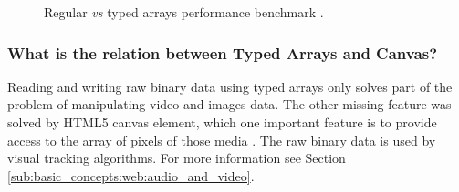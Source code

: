 \begin{figure}[!htb]
  \caption{Regular \textit{vs} typed arrays performance benchmark \cite{TypedArrayPerformance2013}.}
  \label{figure:typed_arrays_performance}
\end{figure}


\subsubsection{What is the relation between Typed Arrays and Canvas?} %
\label{subsub:basic_concepts:web:javascript_typed_arrays:relation_between_typed_and_canvas}

Reading and writing raw binary data using typed arrays only solves part of the problem of manipulating video and images data. The other missing feature was solved by HTML5 canvas element, which one important feature is to provide access to the array of pixels of those media \cite{Canvas2013,Hickson2013}. The raw binary data is used by visual tracking algorithms. For more information see Section \ref{sub:basic_concepts:web:audio_and_video}.

